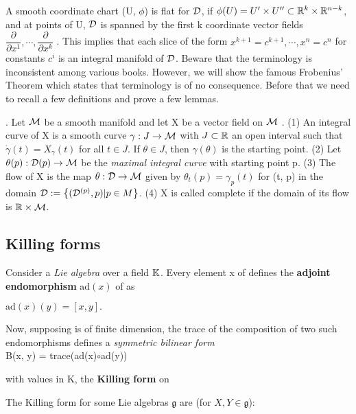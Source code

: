 A smooth coordinate chart (U, $\phi$) is flat for $\mathcal{D}$, if 
$\phi(U) = U' \times U''\subset \mathbb{R}^k \times \mathbb{R}^{n - k}$, and at
points of U, $\mathcal{D}$ is spanned by the first k coordinate vector fields 
$\dfrac{\partial}{\partial x^1} , \cdots , \dfrac{\partial}{\partial x^k}$ . This implies
that each slice of the form $x^{k+1} = c^{k+1} , \cdots, x^n = c^n$ for constants $c^i$ is an integral manifold
of $\mathcal{D}$. Beware that the terminology is inconsistent among various books. However, we will
show the famous Frobenius’ Theorem which states that terminology is of no consequence.
Before that we need to recall a few definitions and prove a few lemmas.
\begin{definition}. Let $\mathcal{M}$ be a smooth manifold and let X be a vector field on $\mathcal{M}$ .
(1) An integral curve of X is a smooth curve $\gamma : J \rightarrow \mathcal{M}$ with $J \subset \mathbb{R}$ an open interval
such that
$\dot{\gamma}(t) = X_{\gamma}(t)$ for all $t \in J$.
If $\theta \in J$, then $\gamma(\theta)$ is the starting point.
(2) Let $\theta(p) : \mathcal{D}(p) \rightarrow \mathcal{M}$ be the \textit{maximal integral curve} with starting point p.
(3) The flow of X is the map $\theta :\mathcal{D} \rightarrow \mathcal{M}$ given by $\theta_{t} (p) = \gamma_{p} (t)$ for (t, p) in the domain
$ \mathcal{D} := \left\lbrace(\mathcal{D}^{(p)} , p) | p \in M \right\rbrace$.
(4) X is called complete if the domain of its flow is $\mathbb{R} \times \mathcal{M}$.
\end{definition}
\subsection{Killing forms}
Consider a \textit{Lie algebra} \gg over a field $\mathbb{K}$. Every element x of \gg defines the 
\textbf{adjoint endomorphism} $\textrm{ad}(x)$ of \gg as 

$\textrm{ad}(x)(y) = [x, y]. $

Now, supposing \gg is of finite dimension, the trace of the composition of two such endomorphisms defines a 
\textit{symmetric
bilinear form}
\\
B(x, y) = trace(ad(x)$\circ$ad(y))

with values in K, the \textbf{Killing form} on \gg

The Killing form for some Lie algebras $\mathfrak{g}$ are (for $X, Y \in \mathfrak{g}$):

